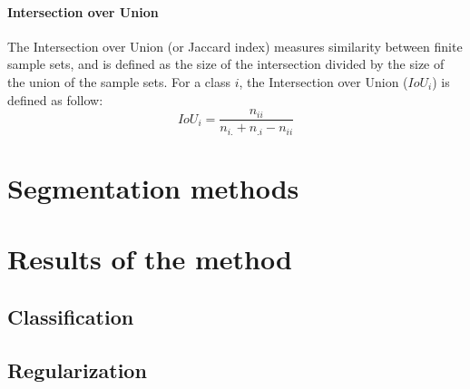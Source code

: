 \paragraph{Intersection over Union \\}
The Intersection over Union (or Jaccard index) \citep{jaccard1912distribution} measures similarity between finite sample sets, and is defined as the size of the intersection divided by the size of the union of the sample sets. For a class $i$, the Intersection over Union ($IoU_{i}$) is defined as follow:
\begin{equation}
IoU_{i}=\frac{n_{ii}}{n_{i.}+n_{.i}-n_{ii}}
\end{equation}


\section{Segmentation methods}






\section{Results of the method}
\subsection{Classification}
\subsection{Regularization}

\stopcontents[chapters]